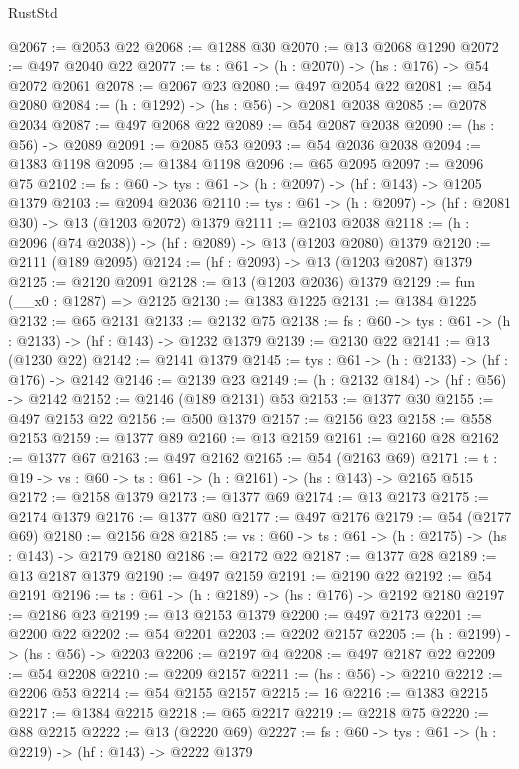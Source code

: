 \begin{lexlean}{RustStd}
\begin{coremodule}
@2067 := @2053 @22
@2068 := @1288 @30
@2070 := @13 @2068 @1290
@2072 := @497 @2040 @22
@2077 := {ts : @61} -> (h : @2070) -> (hs : @176) -> @54 @2072 @2061
@2078 := @2067 @23
@2080 := @497 @2054 @22
@2081 := @54 @2080
@2084 := (h : @1292) -> (hs : @56) -> @2081 @2038
@2085 := @2078 @2034
@2087 := @497 @2068 @22
@2089 := @54 @2087 @2038
@2090 := (hs : @56) -> @2089
@2091 := @2085 @53
@2093 := @54 @2036 @2038
@2094 := @1383 @1198
@2095 := @1384 @1198
@2096 := @65 @2095
@2097 := @2096 @75
@2102 := {fs : @60} -> {tys : @61} -> (h : @2097) -> (hf : @143) -> @1205 @1379
@2103 := @2094 @2036
@2110 := {tys : @61} -> (h : @2097) -> (hf : @2081 @30) -> @13 (@1203 @2072) @1379
@2111 := @2103 @2038
@2118 := (h : @2096 (@74 @2038)) -> (hf : @2089) -> @13 (@1203 @2080) @1379
@2120 := @2111 (@189 @2095)
@2124 := (hf : @2093) -> @13 (@1203 @2087) @1379
@2125 := @2120 @2091
@2128 := @13 (@1203 @2036) @1379
@2129 := fun (__x0 : @1287) => @2125
@2130 := @1383 @1225
@2131 := @1384 @1225
@2132 := @65 @2131
@2133 := @2132 @75
@2138 := {fs : @60} -> {tys : @61} -> (h : @2133) -> (hf : @143) -> @1232 @1379
@2139 := @2130 @22
@2141 := @13 (@1230 @22)
@2142 := @2141 @1379
@2145 := {tys : @61} -> (h : @2133) -> (hf : @176) -> @2142
@2146 := @2139 @23
@2149 := (h : @2132 @184) -> (hf : @56) -> @2142
@2152 := @2146 (@189 @2131) @53
@2153 := @1377 @30
@2155 := @497 @2153 @22
@2156 := @500 @1379
@2157 := @2156 @23
@2158 := @558 @2153
@2159 := @1377 @89
@2160 := @13 @2159
@2161 := @2160 @28
@2162 := @1377 @67
@2163 := @497 @2162
@2165 := @54 (@2163 @69)
@2171 := {t : @19} -> {vs : @60} -> {ts : @61} -> (h : @2161) -> (hs : @143) -> @2165 @515
@2172 := @2158 @1379
@2173 := @1377 @69
@2174 := @13 @2173
@2175 := @2174 @1379
@2176 := @1377 @80
@2177 := @497 @2176
@2179 := @54 (@2177 @69)
@2180 := @2156 @28
@2185 := {vs : @60} -> {ts : @61} -> (h : @2175) -> (hs : @143) -> @2179 @2180
@2186 := @2172 @22
@2187 := @1377 @28
@2189 := @13 @2187 @1379
@2190 := @497 @2159
@2191 := @2190 @22
@2192 := @54 @2191
@2196 := {ts : @61} -> (h : @2189) -> (hs : @176) -> @2192 @2180
@2197 := @2186 @23
@2199 := @13 @2153 @1379
@2200 := @497 @2173
@2201 := @2200 @22
@2202 := @54 @2201
@2203 := @2202 @2157
@2205 := (h : @2199) -> (hs : @56) -> @2203
@2206 := @2197 @4
@2208 := @497 @2187 @22
@2209 := @54 @2208
@2210 := @2209 @2157
@2211 := (hs : @56) -> @2210
@2212 := @2206 @53
@2214 := @54 @2155 @2157
@2215 := 16
@2216 := @1383 @2215
@2217 := @1384 @2215
@2218 := @65 @2217
@2219 := @2218 @75
@2220 := @88 @2215
@2222 := @13 (@2220 @69)
@2227 := {fs : @60} -> {tys : @61} -> (h : @2219) -> (hf : @143) -> @2222 @1379

\end{coremodule}
\end{lexlean}
